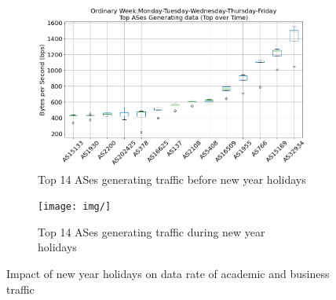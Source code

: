 \documentclass[10pt, journal, letterpaper]{IEEEtran}
\newcommand\figSzeMahdi{0.8}
\begin{document}
\begin{figure}[hbt!]
    \centering
    \begin{subfigure}{\figSzeMahdi\columnwidth}
          \centering
          \includegraphics[width=\columnwidth]{img/OWD_top14AS_generating_bps.png}
          \caption{Top 14 ASes generating traffic before new year holidays}
          \label{fig:BCH2_topAS_gen_bps}
    \end{subfigure}
    \begin{subfigure}{\figSzeMahdi\columnwidth}
          \centering
          \texttt{[image: img/]}
          \caption{Top 14 ASes generating traffic during new year holidays}
          \label{fig:CH2_topAS_gen_bps}
    \end{subfigure}
    \caption{Impact of new year holidays on data rate of academic and business traffic}
    \label{fig:topAS_gen_BCH_CH}
\end{figure}
\end{document}
